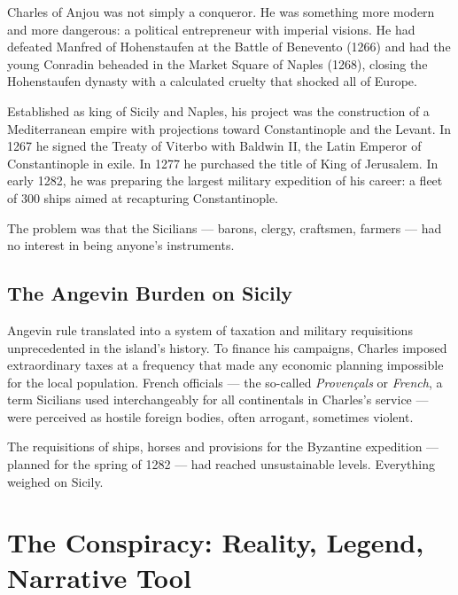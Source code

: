 Charles of Anjou was not simply a conqueror. He was something more modern
and more dangerous: a political entrepreneur with imperial visions. He had
defeated Manfred of Hohenstaufen at the Battle of Benevento (1266) and
had the young Conradin beheaded in the Market Square of Naples (1268),
closing the Hohenstaufen dynasty with a calculated cruelty that shocked
all of Europe.

Established as king of Sicily and Naples, his project was the construction
of a Mediterranean empire with projections toward Constantinople and the
Levant. In 1267 he signed the Treaty of Viterbo with Baldwin II, the
Latin Emperor of Constantinople in exile. In 1277 he purchased the title
of King of Jerusalem. In early 1282, he was preparing the largest military
expedition of his career: a fleet of 300 ships aimed at recapturing
Constantinople.


The problem was that the Sicilians — barons, clergy, craftsmen, farmers —
had no interest in being anyone's instruments.

\subsection{The Angevin Burden on Sicily}

Angevin rule translated into a system of taxation and military requisitions
unprecedented in the island's history. To finance his campaigns, Charles
imposed extraordinary taxes at a frequency that made any economic planning
impossible for the local population. French officials — the so-called
\textit{Provençals} or \textit{French}, a term Sicilians used
interchangeably for all continentals in Charles's service — were perceived
as hostile foreign bodies, often arrogant, sometimes violent.

The requisitions of ships, horses and provisions for the Byzantine
expedition — planned for the spring of 1282 — had reached unsustainable
levels. Everything weighed on Sicily.

\secsep

\section{The Conspiracy: Reality, Legend, Narrative Tool}

